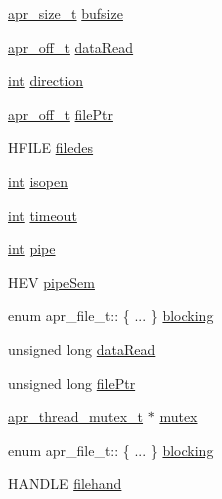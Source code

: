 \begin{DoxyCompactItemize}
\item 
\hyperlink{group__apr__platform_gaaa72b2253f6f3032cefea5712a27540e}{apr\+\_\+size\+\_\+t} \hyperlink{structapr__file__t_afa64666024c66b21aa0c95a388f5b8fa}{bufsize}
\item 
\hyperlink{group__apr__platform_ga6938af9075cec15c88299109381aa984}{apr\+\_\+off\+\_\+t} \hyperlink{structapr__file__t_a704868f4d08e3d50a0911b2b3ed4276d}{data\+Read}
\item 
\hyperlink{pcre_8txt_a42dfa4ff673c82d8efe7144098fbc198}{int} \hyperlink{structapr__file__t_a083307504dc0755c9bec5b59700f8713}{direction}
\item 
\hyperlink{group__apr__platform_ga6938af9075cec15c88299109381aa984}{apr\+\_\+off\+\_\+t} \hyperlink{structapr__file__t_a2c10542025ab056723a76a7a4a5c8ba6}{file\+Ptr}
\item 
H\+F\+I\+LE \hyperlink{structapr__file__t_a9aa7c92f6976c9b6ff1773ef8f3df86a}{filedes}
\item 
\hyperlink{pcre_8txt_a42dfa4ff673c82d8efe7144098fbc198}{int} \hyperlink{structapr__file__t_a3be15940af77262235205e6e35ddd6ae}{isopen}
\item 
\hyperlink{pcre_8txt_a42dfa4ff673c82d8efe7144098fbc198}{int} \hyperlink{structapr__file__t_a155926dc60e6b4fa71e533e62f1830e7}{timeout}
\item 
\hyperlink{pcre_8txt_a42dfa4ff673c82d8efe7144098fbc198}{int} \hyperlink{structapr__file__t_a324c8ecdc7eb0c029f38ce5d6ebc5157}{pipe}
\item 
H\+EV \hyperlink{structapr__file__t_a06f6955487ff6617d61d26e8571a6e63}{pipe\+Sem}
\item 
enum apr\+\_\+file\+\_\+t\+:: \{ ... \}  \hyperlink{structapr__file__t_a03901e6463f3db65a062d63544c785c0}{blocking}
\item 
unsigned long \hyperlink{structapr__file__t_a704868f4d08e3d50a0911b2b3ed4276d}{data\+Read}
\item 
unsigned long \hyperlink{structapr__file__t_ab3247e5a81e799ec4af48d450be6e42b}{file\+Ptr}
\item 
\hyperlink{structapr__thread__mutex__t}{apr\+\_\+thread\+\_\+mutex\+\_\+t} $\ast$ \hyperlink{structapr__file__t_a3d4f09cc6f89ac51cceb04be20e027db}{mutex}
\item 
enum apr\+\_\+file\+\_\+t\+:: \{ ... \}  \hyperlink{structapr__file__t_a43a777b0612e7c36dc3ede789272c774}{blocking}
\item 
H\+A\+N\+D\+LE \hyperlink{structapr__file__t_acdb343a6f266295b6e63b288744074db}{filehand}
\item 

\end{DoxyCompactItemize}
